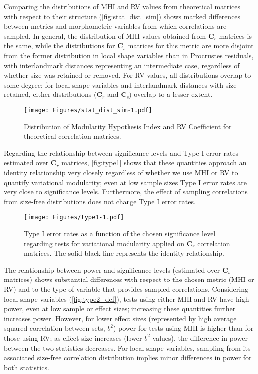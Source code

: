 \documentclass[12pt,]{article}
\begin{document}
Comparing the distributions of MHI and RV values from theoretical
matrices with respect to their structure (\autoref{fig:stat_dist_sim})
shows marked differences between metrics and morphometric variables from
which correlations are sampled. In general, the distribution of MHI
values obtained from $\mathbf{C}_r$ matrices is the same, while the
distributions for $\mathbf{C}_s$ matrices for this metric are more
disjoint from the former distribution in local shape variables than in
Procrustes residuals, with interlandmark distances representing an
intermediate case, regardless of whether size was retained or removed.
For RV values, all distributions overlap to some degree; for local shape
variables and interlandmark distances with size retained, either
distributions ($\mathbf{C}_r$ and $\mathbf{C}_s$) overlap to a lesser
extent.

\begin{figure}[htbp]
\centering
\texttt{[image: Figures/stat\_dist\_sim-1.pdf]}
\caption{Distribution of Modularity Hypothesis Index and RV Coefficient
for theoretical correlation matrices. \label{fig:stat_dist_sim}}
\end{figure}

Regarding the relationship between significance levels and Type I error
rates estimated over $\mathbf{C}_r$ matrices, \autoref{fig:type1} shows
that these quantities approach an identity relationship very closely
regardless of whether we use MHI or RV to quantify variational
modularity; even at low sample sizes Type I error rates are very close
to significance levels. Furthermore, the effect of sampling correlations
from size-free distributions does not change Type I error rates.

\begin{figure}[htbp]
\centering
\texttt{[image: Figures/type1-1.pdf]}
\caption{Type I error rates as a function of the chosen significance
level regarding tests for variational modularity applied on
$\mathbf{C}_r$ correlation matrices. The solid black line represents the
identity relationship. \label{fig:type1}}
\end{figure}

The relationship between power and significance levels (estimated over
$\mathbf{C}_s$ matrices) shows substantial differences with respect to
the chosen metric (MHI or RV) and to the type of variable that provides
sampled correlations. Considering local shape variables
(\autoref{fig:type2_def}), tests using either MHI and RV have high
power, even at low sample or effect sizes; increasing these quantities
further increases power. However, for lower effect sizes (represented by
high average squared correlation between sets, $b^2$) power for tests
using MHI is higher than for those using RV; as effect size increases
(lower $b^2$ values), the difference in power between the two statistics
decreases. For local shape variables, sampling from its associated
size-free correlation distribution implies minor differences in power
for both statistics.
\end{document}
